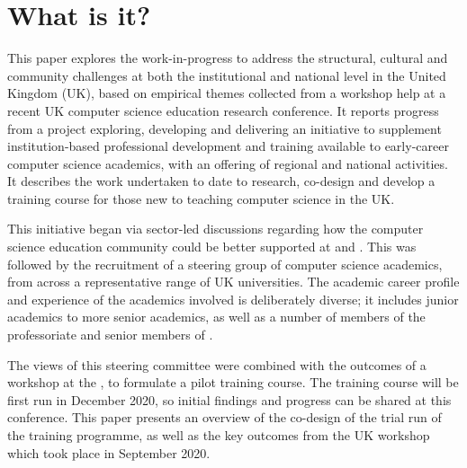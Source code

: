 \documentclass[sigconf]{acmart}
\begin{document}


\maketitle

\section{What is it?}	
This paper explores the work-in-progress to address the structural, cultural and community challenges at both the institutional and national level in the United Kingdom (UK), based on empirical themes collected from a workshop help at a recent UK computer science education research conference. It reports progress from a project exploring, developing and delivering an initiative to supplement institution-based professional development and training available to early-career computer science academics, with an offering of regional and national activities. It describes the work undertaken to date to research, co-design and develop a training course for those new to teaching computer science in the UK. 

This initiative began via sector-led discussions regarding how the computer science education community could be better supported at  and . This was followed by the recruitment of a steering group of computer science academics, from across a representative range of UK universities. The academic career profile and experience of the academics involved is deliberately diverse; it includes junior academics to more senior academics, as well as a number of members of the professoriate and senior members of . \begin{comment}
content...
The group also includes a number of computer science academics who have been recognised as National Teaching Fellows by Advance HE. 
\end{comment}
The views of this steering committee were combined with the outcomes of a workshop at the , to formulate a pilot training course. The training course will be first run in December 2020, so initial findings and progress can be shared at this conference. This paper presents an overview of the co-design of the trial run of the training programme, as well as the key outcomes from the UK workshop which took place in September 2020.
\end{document}
